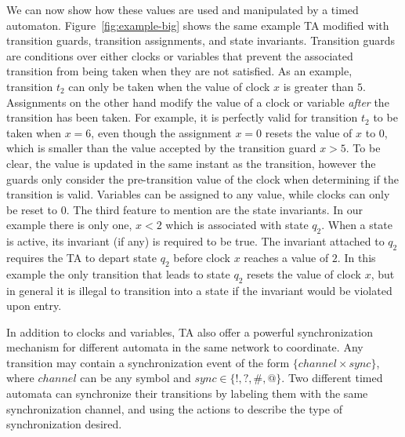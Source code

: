 \documentclass[a4paper,11pt]{report}
\theoremstyle{definition}
\begin{document}
We can now show how these values are used and manipulated by a timed automaton.
Figure~\ref{fig:example-big} shows the same example TA modified with transition
guards, transition assignments, and state invariants. Transition guards are
conditions over either clocks or variables that prevent the associated
transition from being taken when they are not satisfied. As an example,
transition $t_{2}$ can only be taken when the value of clock $x$ is greater than
$5$. Assignments on the other hand modify the value of a clock or variable
\emph{after} the transition has been taken. For example, it is perfectly valid
for transition $t_{2}$ to be taken when $x=6$, even though the assignment $x=0$
resets the value of $x$ to $0$, which is smaller than the value accepted by the
transition guard $x>5$. To be clear, the value is updated in the same instant as
the transition, however the guards only consider the pre-transition value of the
clock when determining if the transition is valid. Variables can be assigned to
any value, while clocks can only be reset to $0$. The third feature to mention
are the state invariants. In our example there is only one, $x<2$ which is
associated with state $q_{2}$. When a state is active, its invariant (if any) is
required to be true. The invariant attached to $q_{2}$ requires the TA to depart
state $q_{2}$ before clock $x$ reaches a value of $2$. In this example the only
transition that leads to state $q_{2}$ resets the value of clock $x$, but in
general it is illegal to transition into a state if the invariant would be
violated upon entry.


In addition to clocks and variables, TA also offer a powerful synchronization
mechanism for different automata in the same network to coordinate. Any
transition may contain a synchronization event of the form
$\{channel \times sync\}$, where $channel$ can be any symbol and
$sync \in \{!,?,\#,@\}$. Two different timed automata can synchronize their
transitions by labeling them with the same synchronization channel, and using
the actions to describe the type of synchronization desired.
\end{document}
